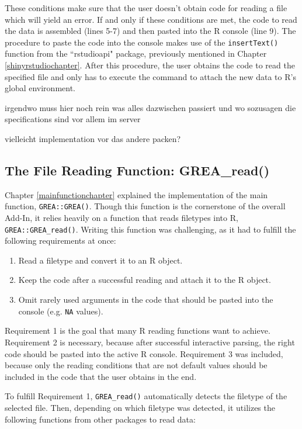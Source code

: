 \documentclass[12pt]{article} %
\newcommand{\li}{\lstinline}
\begin{document}
These conditions make sure that the user doesn't obtain code for reading a file which will yield an error. If and only if these conditions are met, the code to read the data is assembled (lines 5-7)  and then pasted into the R console (line 9). The procedure to paste the code into the console makes use of the \li{insertText()} function from the ``rstudioapi" package, previously mentioned in Chapter \ref{shinyrstudiochapter}. After this procedure, the user obtains the code to read the specified file and only has to execute the command to attach the new data to R's global environment.

irgendwo muss hier noch rein was alles dazwischen passiert und wo sozusagen die specifications sind vor allem im server

vielleicht implementation vor das andere packen?

\subsection{The File Reading Function: \textrm{GREA\_read()}}
Chapter \ref{mainfunctionchapter} explained the implementation of the main function, \li{GREA::GREA()}. Though this function is the cornerstone of the overall Add-In, it relies heavily on a function that reads filetypes into R, \li{GREA::GREA_read()}. Writing this function was challenging, as it had to fulfill the following requirements at once:

\begin{enumerate}
\item Read a filetype and convert it to an R object.
\item Keep the code after a successful reading and attach it to the R object.
\item Omit rarely used arguments in the code that should be pasted into the console (e.g. \li{NA} values).
\end{enumerate}

Requirement 1 is the goal that many R reading functions want to achieve. Requirement 2 is necessary, because after successful interactive parsing, the right code should be pasted into the active R console. Requirement 3 was included, because only the reading conditions that are not default values should be included in the code that the user obtains in the end.

To fulfill Requirement 1, \li{GREA_read()} automatically detects the filetype of the selected file. Then, depending on which filetype was detected, it utilizes the following functions from other packages to read data:
\end{document}
